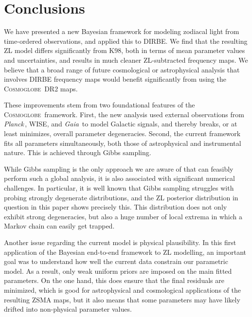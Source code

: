 \documentclass[twocolumn]{aa}
\def\Planck{\textit{Planck}}
\def\GAIA{\textit{Gaia}}
\newcommand{\cosmoglobe}{\textsc{Cosmoglobe}}
\begin{document}


\section{Conclusions}
\label{sec:conclusions}

We have presented a new Bayesian framework for modeling zodiacal
light from time-ordered observations, and applied this to 
DIRBE. We find that the resulting ZL model differs
significantly from K98, both in terms of mean parameter
values and uncertainties, and results in much cleaner
ZL-subtracted frequency maps. We believe that a broad range of future
cosmological or astrophysical analysis that involves DIRBE frequency
maps would benefit significantly from using the \cosmoglobe\ DR2 maps.

These improvements stem from two foundational features of the
\cosmoglobe\ framework. First, the new analysis used external
observations from \Planck\,, WISE, and \GAIA\ to model Galactic signals,
and thereby breaks, or at least minimizes, overall parameter
degeneracies. Second, the current framework fits all parameters
simultaneously, both those of astrophysical and instrumental
nature. This is achieved through Gibbs sampling.

While Gibbs sampling is the only approach we are aware of that 
can feasibly perform such a global analysis, it is also associated with 
significant numerical challenges. In particular, it is well known that Gibbs
sampling struggles with probing strongly degenerate distributions, and
the ZL posterior distribution in question in this paper shows
precisely this. This distribution does not only exhibit strong
degeneracies, but also a huge number of local extrema in which a
Markov chain can easily get trapped.

Another issue regarding the current model is physical plausibility. In
this first application of the Bayesian end-to-end framework to ZL
modelling, an important goal was to understand how well the current
data constrain our parametric model. As a result, only weak uniform
priors are imposed on the main fitted parameters. On the one hand,
this does ensure that the final residuals are minimized, which is good
for astrophysical and cosmological applications of the resulting ZSMA
maps, but it also means that some parameters may have likely drifted
into non-physical parameter values.
\end{document}
